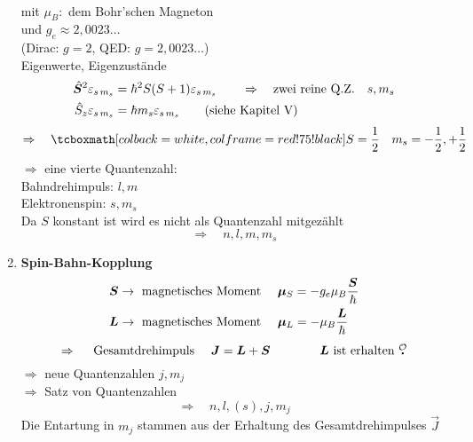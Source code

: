 \begin{enumerate}[1)]
\begin{minipage}{.2\linewidth}
	\end{minipage}%
	\\
	mit $ \mu_B : $ dem Bohr'schen Magneton\\
	und $ g_e \approx 2{,}0023 \dots $\\
	(Dirac: $ g = 2 $, QED: $ g = 2{,}0023 \dots $)\\[5pt]
	Eigenwerte, Eigenzustände
	\begin{align*}
	\hat{\bm{S}}^2 \varepsilon_{s \, m_s} &= \hbar^2 S (S + 1) \varepsilon_{s \, m_s} \qquad \Rightarrow \quad \textrm{zwei reine Q.Z.} \quad s, m_s\\
	\hat{S}_z \varepsilon_{s \, m_s} &= \hbar m_s \varepsilon_{s \, m_s} \qquad (\textrm{siehe Kapitel V})
	\end{align*}
	\begin{equation*}
	\Rightarrow \quad \rmbox{ S = \frac{1}{2} \quad m_s = - \frac{1}{2}, + \frac{1}{2} }
	\end{equation*}
	\noindent
	$ \Rightarrow $ eine vierte Quantenzahl:\\[5pt]
	Bahndrehimpuls: $ l, m $\\
	Elektronenspin: $ s, m_s $\\
	Da $ S $ konstant ist wird es nicht als Quantenzahl mitgezählt
	\begin{equation*}
	\Rightarrow \quad n, l, m, m_s
	\end{equation*}
	\item \textbf{Spin-Bahn-Kopplung}
	\begin{align*}
	\bm{S} &\to \textrm{ magnetisches Moment } \quad \bm{\mu}_{S} = - g_e \mu_{B} \frac{\bm{S}}{\hbar}\\
	\bm{L} &\to \textrm{ magnetisches Moment } \quad \bm{\mu}_{L} = - \mu_{B} \frac{\bm{L}}{\hbar}
	\end{align*}
	\begin{equation*}
	\Rightarrow \quad \tx{ Gesamtdrehimpuls } \quad \vec{J} = \vec{L} + \vec{S} \qquad \qquad \vec{L} \tx{ ist erhalten \mau}
	\end{equation*}
	$ \Rightarrow $ neue Quantenzahlen $ j, m_j $\\
	$ \Rightarrow $ Satz von Quantenzahlen
	\begin{equation*}
	\Rightarrow \quad n, l, (s), j, m_j
	\end{equation*}
	Die Entartung in $ m_j $ stammen aus der Erhaltung des Gesamtdrehimpulses $ \vec{J} $ \mau
\end{enumerate}

